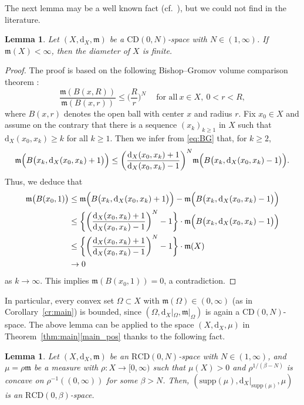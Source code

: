 \documentclass[sts]{imsart}
\newtheorem{lemma}[theorem]{Lemma}
\theoremstyle{definition}
\theoremstyle{remark}
\newcommand{\fm}{\mathfrak{m}}
\newcommand{\dist}{\mathrm{d}}
\newcommand{\lra}{\longrightarrow}
\newcommand{\CD}{\mathrm{CD}}
\newcommand{\RCD}{\mathrm{RCD}}
\newcommand{\supp}{\mathrm{supp}}
\newcommand{\veb}[1]{\textcolor{blue}{\textbf{VEB:}  #1}}
\begin{document}
The next lemma may be a well known fact (cf.\ \cite[Theorem~7]{Ya}), but we could not find in the literature.

\begin{lemma}\label{lm:bdd}
Let $(X,\dist_X,\fm)$ be a $\CD(0,N)$-space with $N \in (1,\infty)$.
If $\fm(X)<\infty$, then the diameter of $X$ is finite.
\end{lemma}

\begin{proof}
The proof is based on the following Bishop--Gromov volume comparison theorem \cite[Theorem 2.3]{SturmII}: 
\begin{equation}\label{eq:BG}
\frac{\fm(B(x,R))}{\fm(B(x,r))} \le \biggl( \frac{R}{r} \biggr)^N
\quad\ \text{for all}\ x \in X,\ 0<r<R,
\end{equation}
where $B(x,r)$ denotes the open ball with center $x$ and radius $r$.
Fix $x_0 \in X$ and assume on the contrary that there is a sequence $(x_k)_{k \ge 1}$ in $X$ such that $\dist_X(x_0,x_k) \ge k$ for all $k\geq 1$.
Then we infer from \eqref{eq:BG} that, for $k \ge 2$,
\[ \fm\Bigl( B\bigl( x_k,\dist_X(x_0,x_k)+1 \bigr) \Bigr)
\le \biggl( \frac{\dist_X(x_0,x_k)+1}{\dist_X(x_0,x_k)-1} \biggr)^N \fm\Bigl( B\bigl( x_k,\dist_X(x_0,x_k)-1 \bigr) \Bigr). \]
Thus, we deduce that
\begin{align*}
\fm\bigl( B(x_0,1) \bigr)
&\le \fm\Bigl( B\bigl( x_k,\dist_X(x_0,x_k)+1 \bigr) \Bigr) -\fm\Bigl( B\bigl( x_k,\dist_X(x_0,x_k)-1 \bigr) \Bigr) \\
&\le \biggl\{ \biggl( \frac{\dist_X(x_0,x_k)+1}{\dist_X(x_0,x_k)-1} \biggr)^N -1 \biggr\} \cdot \fm\Bigl( B\bigl( x_k,\dist_X(x_0,x_k)-1 \bigr) \Bigr) \\
&\le \biggl\{ \biggl( \frac{\dist_X(x_0,x_k)+1}{\dist_X(x_0,x_k)-1} \biggr)^N -1 \biggr\} \cdot \fm(X) \\
&\to 0
\end{align*}
as $k \to \infty$.
This implies $\fm(B(x_0,1))=0$, a contradiction.
\end{proof}

In particular, every convex set $\Omega \subset X$ with $\fm(\Omega) \in (0,\infty)$ (as in Corollary~\ref{cr:main}) is bounded,
since $(\Omega,\dist_X|_{\Omega},\fm|_{\Omega})$ is again a $\CD(0,N)$-space.
The above lemma can be applied to the space $(X,\dist_X,\mu)$ in Theorem~\ref{thm:main}\eqref{main_pos} thanks to the following fact.

\begin{lemma}\label{lm:beta}
Let $(X,\dist_X,\fm)$ be an $\RCD(0,N)$-space with $N \in (1,\infty)$,
and $\mu=\rho \fm$ be a measure with $\rho \colon X \lra [0,\infty)$
such that $\mu(X)>0$ and $\rho^{1/(\beta -N)}$ is concave on $\rho^{-1}((0,\infty))$ for some $\beta>N$.
Then, $(\supp(\mu),\dist_X|_{\supp(\mu)},\mu)$ is an $\RCD(0,\beta)$-space.
\end{lemma}
\end{document}
